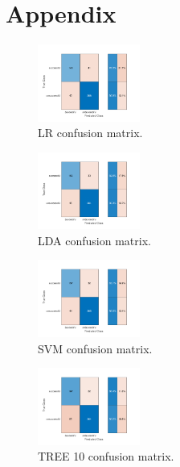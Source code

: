 \section*{Appendix}

\begin{figure}[htbp!]
  \centerline{\includegraphics[width=0.3\textwidth]{../../code/hw3/matlab/figures/LR_confusion.pdf}}
  \caption{LR confusion matrix.}
  \label{fig:LR_confusion}
\end{figure}

\begin{figure}[htbp!]
  \centerline{\includegraphics[width=0.3\textwidth]{../../code/hw3/matlab/figures/LDA_confusion.pdf}}
  \caption{LDA confusion matrix.}
  \label{fig:LDA_confusion}
\end{figure}

\begin{figure}[htbp!]
  \centerline{\includegraphics[width=0.3\textwidth]{../../code/hw3/matlab/figures/SVM_confusion.pdf}}
  \caption{SVM confusion matrix.}
  \label{fig:SVM_confusion}
\end{figure}

\begin{figure}[htbp!]
  \centerline{\includegraphics[width=0.3\textwidth]{../../code/hw3/matlab/figures/TREE_10_confusion.pdf}}
  \caption{TREE 10 confusion matrix.}
  \label{fig:TREE_10_confusion}
\end{figure}

